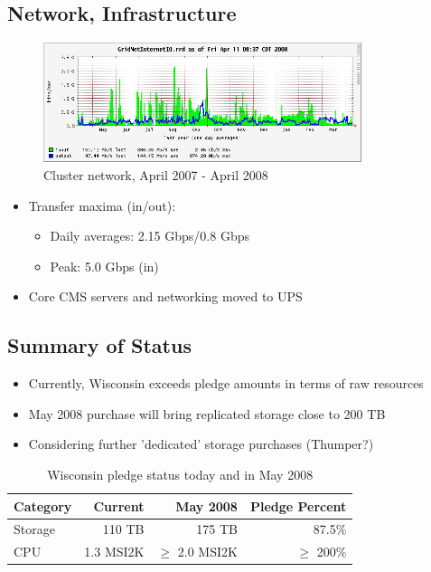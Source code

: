 \documentclass{beamer}
\begin{document}
\subsection{Network, Infrastructure}
\begin{frame}
\begin{figure}
    \includegraphics[height=3.5cm]{Graphics/gridnetio-1year.png}
    \caption{Cluster network, April 2007 - April 2008}
\end{figure}

\begin{itemize}
    \item Transfer maxima (in/out):
    \begin{itemize}
        \item Daily averages: 2.15 Gbps/0.8 Gbps
        \item Peak: 5.0 Gbps (in)
    \end{itemize}
    \item Core CMS servers and networking moved to UPS
\end{itemize}
\end{frame}

\subsection{Summary of Status}
\begin{frame}
\begin{itemize}
    \item Currently, Wisconsin exceeds pledge amounts in terms of raw resources
    \item May 2008 purchase will bring replicated storage close to 200 TB
    \item Considering further 'dedicated' storage purchases (Thumper?)
\end{itemize}
\begin{table}
     \begin{tabular}{lrrr}
         \toprule
         Category    & Current       & May 2008      & Pledge Percent \\
         \midrule
         Storage     & 110 TB        & 175 TB        & 87.5\%\footnotemark[1] \\
         CPU         & 1.3 MSI2K     & $\geq$ 2.0 MSI2K & $\geq$ 200\% \\
         \bottomrule
     \end{tabular}
     \caption{Wisconsin pledge status today and in May 2008}
\end{table}

\end{frame}
\end{document}
